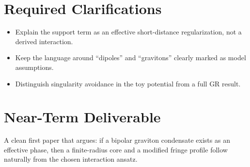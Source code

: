 \documentclass[11pt]{article}
\begin{document}
\section*{Required Clarifications}
\begin{itemize}[leftmargin=1.25em]
  \item Explain the support term as an effective short-distance regularization, not a derived interaction.
  \item Keep the language around ``dipoles'' and ``gravitons'' clearly marked as model assumptions.
  \item Distinguish singularity avoidance in the toy potential from a full GR result.
\end{itemize}

\section*{Near-Term Deliverable}
A clean first paper that argues: if a bipolar graviton condensate exists as an effective phase, then a finite-radius core and a modified fringe profile follow naturally from the chosen interaction ansatz.
\end{document}
